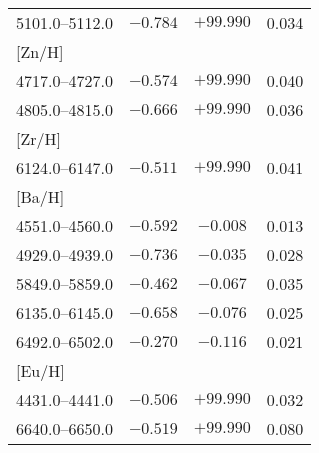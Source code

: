 \documentclass{aa}
\begin{document}
\begin{appendix}
\begin{table}
{\begin{tabular}{lccc}
5101.0--5112.0 & $-0.784$ & $+99.990$ & 0.034\\
\mbox{[Zn/H]} \\
4717.0--4727.0 & $-0.574$ & $+99.990$ & 0.040\\
4805.0--4815.0 & $-0.666$ & $+99.990$ & 0.036\\
\mbox{[Zr/H]} \\
6124.0--6147.0 & $-0.511$ & $+99.990$ & 0.041\\
\mbox{[Ba/H]} \\
4551.0--4560.0 & $-0.592$ & $-0.008$ & 0.013\\
4929.0--4939.0 & $-0.736$ & $-0.035$ & 0.028\\
5849.0--5859.0 & $-0.462$ & $-0.067$ & 0.035\\
6135.0--6145.0 & $-0.658$ & $-0.076$ & 0.025\\
6492.0--6502.0 & $-0.270$ & $-0.116$ & 0.021\\
\mbox{[Eu/H]} \\
4431.0--4441.0 & $-0.506$ & $+99.990$ & 0.032\\
6640.0--6650.0 & $-0.519$ & $+99.990$ & 0.080\\
\hline
\end{tabular}
}
\end{table}


\end{appendix}
\end{document}
